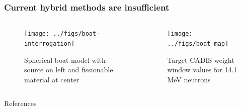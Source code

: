 \documentclass[xcolor=x11names,compress]{beamer}
\renewcommand{\(}{\begin{columns}}
\renewcommand{\)}{\end{columns}}
\newcommand{\<}[1]{\begin{column}{#1}}
\renewcommand{\>}{\end{column}}
\begin{document}
\begin{frame}[fragile]
  \frametitle{Current hybrid methods are insufficient}

	\begin{columns}
  	\begin{column}{0.5\textwidth}
 	 \begin{center}
 	 \begin{figure}
 	 \texttt{[image: ../figs/boat-interrogation]}  
 	 \caption{Spherical boat model with source on left and fissionable material at center}
 	 \end{figure}
 	 \end{center}
  	\end{column}
 	\begin{column}{0.5\textwidth}
 	 \begin{center}
 	 \begin{figure}
 	 \texttt{[image: ../figs/boat-map]}  
 	 \caption{Target CADIS weight window values for 14.1 MeV neutrons}
 	 \end{figure}
 	 \end{center}
  	\end{column}
	\end{columns}

\end{frame}

\begin{frame}[allowframebreaks]{References}
	
	
\end{frame}
\end{document}
